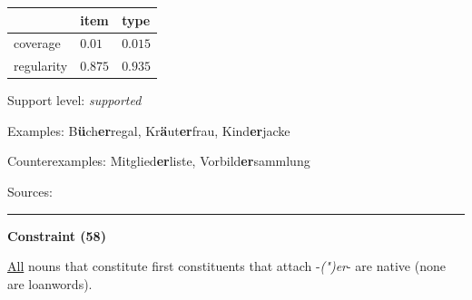 \vspace{-0.35em}

\begin{table}[!ht]
\begin{center}

\begin{tabularx}{\columnwidth}{|X|X|X|}
\hline
 & item & type \\
\hline
 coverage & $0.01$ & $0.015$ \\
\hline
 regularity & $0.875$ & $0.935$ \\
\hline
\end{tabularx}
\end{center}
\end{table}

\vspace{-1.35em}

\noindent
Support level: \textit{supported}

\vspace{0.3em}

\noindent
Examples: B\textbf{ü}ch\textbf{er}regal, Kr\textbf{ä}ut\textbf{er}frau, Kind\textbf{er}jacke

\noindent
Counterexamples: Mitglied\textbf{er}liste, Vorbild\textbf{er}sammlung

\vspace{0.3em}

\noindent
Sources: \citet[98]{ortner_mueller-bollhagen_1991}


\hrule




\vspace{0.4em}

\begin{center}
\textbf{Constraint (58)}
\end{center}

\noindent
\underline{All} nouns that constitute first constituents that attach -\textit{(")er}- are native (none are loanwords).
\vspace{0.35em}


